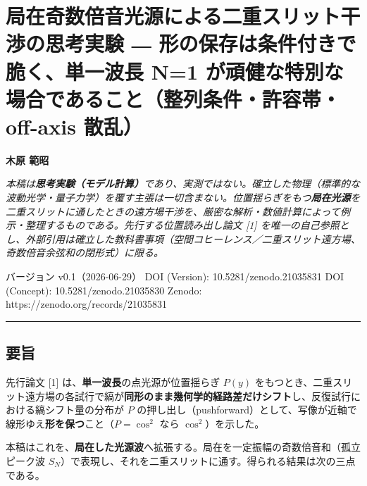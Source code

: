 \documentclass[
]{ltjsarticle}
\author{}
\date{}
\begin{document}
\section{局在奇数倍音光源による二重スリット干渉の思考実験 ―
形の保存は条件付きで脆く、単一波長 N=1
が頑健な特別な場合であること（整列条件・許容帯・off-axis
散乱）}\label{ux5c40ux5728ux5947ux6570ux500dux97f3ux5149ux6e90ux306bux3088ux308bux4e8cux91cdux30b9ux30eaux30c3ux30c8ux5e72ux6e09ux306eux601dux8003ux5b9fux9a13-ux5f62ux306eux4fddux5b58ux306fux6761ux4ef6ux4ed8ux304dux3067ux8106ux304fux5358ux4e00ux6ce2ux9577-n1-ux304cux9811ux5065ux306aux7279ux5225ux306aux5834ux5408ux3067ux3042ux308bux3053ux3068ux6574ux5217ux6761ux4ef6ux8a31ux5bb9ux5e2foff-axis-ux6563ux4e71}

\textbf{木原 範昭}

\emph{本稿は\textbf{思考実験（モデル計算）}であり、実測ではない。確立した物理（標準的な波動光学・量子力学）を覆す主張は一切含まない。位置揺らぎをもつ\textbf{局在光源}を二重スリットに通したときの遠方場干渉を、厳密な解析・数値計算によって例示・整理するものである。先行する位置読み出し論文
{[}1{]}
を唯一の自己参照とし、外部引用は確立した教科書事項（空間コヒーレンス／二重スリット遠方場、奇数倍音余弦和の閉形式）に限る。}

バージョン v0.1（2026-06-29） DOI (Version): 10.5281/zenodo.21035831 DOI
(Concept): 10.5281/zenodo.21035830 Zenodo:
https://zenodo.org/records/21035831

\begin{center}\rule{0.5\linewidth}{0.5pt}\end{center}

\subsection{要旨}\label{ux8981ux65e8}

先行論文 {[}1{]} は、\textbf{単一波長}の点光源が位置揺らぎ \(P(y)\)
をもつとき、二重スリット遠方場の各試行で縞が\textbf{同形のまま幾何学的経路差だけシフト}し、反復試行における縞シフト量の分布が
\(P\)
の押し出し（pushforward）として、写像が近軸で線形ゆえ\textbf{形を保つ}こと（\(P=\cos^2\)
なら \(\cos^2\)）を示した。

本稿はこれを、\textbf{局在した光源波}へ拡張する。局在を一定振幅の奇数倍音和（孤立ピーク波
\(S_N\)）で表現し、それを二重スリットに通す。得られる結果は次の三点である。
\end{document}
